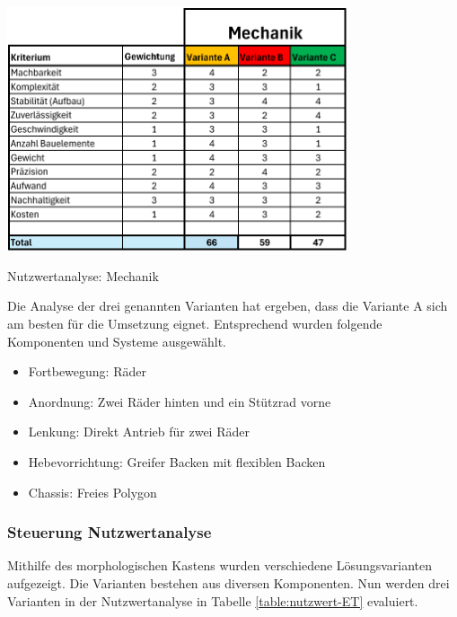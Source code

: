 \begin{table}[H]
\centering
\includegraphics[width=0.75\textwidth]{assets/Nutzwertanalyse-M.pdf}
\caption{Nutzwertanalyse: Mechanik}
\label{table:nutzwert-maschinentechnik}
\end{table}

Die Analyse der drei genannten Varianten hat ergeben, dass die Variante A sich am besten für die Umsetzung eignet. Entsprechend wurden folgende Komponenten und Systeme ausgewählt. 

\begin{itemize}
    \item Fortbewegung: Räder 
    \item Anordnung:  Zwei Räder hinten und ein Stützrad vorne
    \item Lenkung: Direkt Antrieb für zwei Räder
    \item Hebevorrichtung: Greifer Backen mit flexiblen Backen
    \item Chassis: Freies Polygon
\end{itemize}

\subsubsection*{Steuerung Nutzwertanalyse}


Mithilfe des morphologischen Kastens wurden verschiedene Lösungsvarianten aufgezeigt. Die Varianten bestehen aus diversen Komponenten. 
Nun werden drei Varianten in der Nutzwertanalyse in Tabelle \ref{table:nutzwert-ET} evaluiert.

